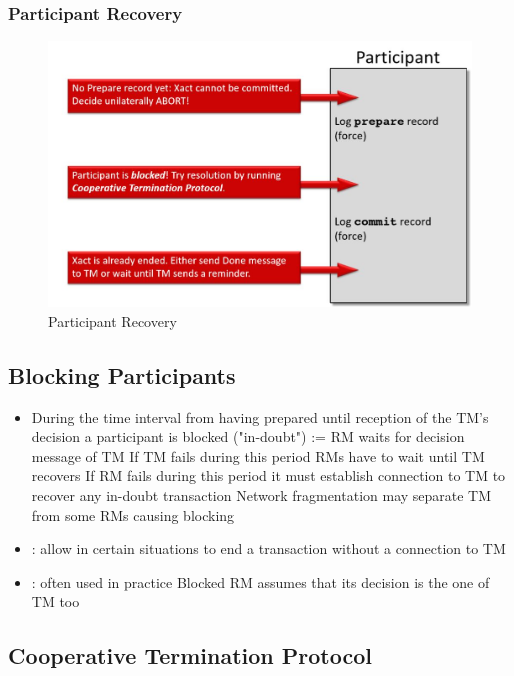 			\subsubsection{Participant Recovery}
				\begin{figure}[h!]
					\includegraphics[scale=0.25]{res/participant_recovery.jpg}
					\caption{Participant Recovery}
				\end{figure}
			
		\clearpage	
		\subsection{Blocking Participants}
			\begin{itemize}
				\item During the time interval from having prepared until reception of the TM's decision a participant is blocked ("in-doubt") 
					\subitem {}:= RM waits for decision message of TM 
					\subitem If TM fails during this period RMs have to wait until TM recovers 
					\subitem If RM fails during this period it must establish connection to TM to recover any in-doubt transaction 
					\subitem Network fragmentation may separate TM from some RMs causing blocking
				\item {}: allow in certain situations to end a transaction without a connection to TM 
				\item  {}: often used in practice 
					\subitem Blocked RM assumes that its decision is the one of TM too
					
		\end{itemize}
		
		\subsection{Cooperative Termination Protocol}
		
